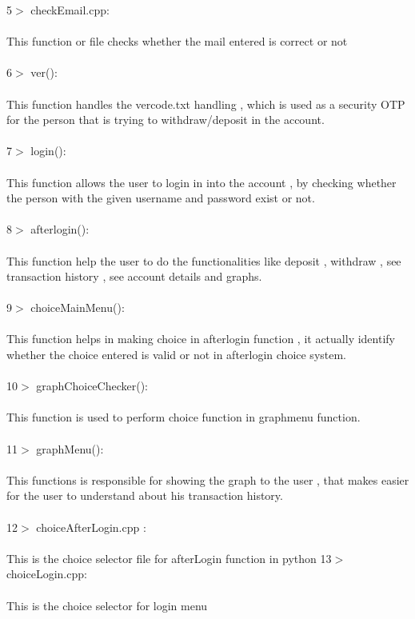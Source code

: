 \documentclass[11pt]{article}
\begin{document}
5$>$ checkEmail.cpp:\\\\
This function or file checks whether the mail entered is correct or not\\\\
6$>$ ver():\\\\
This function handles the vercode.txt handling , which is used as a security OTP for the person that is trying to withdraw/deposit in the account.\\\\
7$>$ login():\\\\
This function allows the user to login in into the account , by checking whether the person with the given username and password exist or not.\\\\
8$>$ afterlogin():\\\\
This function help the user to do the functionalities like deposit , withdraw , see transaction history , see account details and graphs.\\\\
9$>$ choiceMainMenu():\\\\
This function helps in making choice in afterlogin function , it actually identify whether the choice entered is valid or not in afterlogin choice system.\\\\
10$>$ graphChoiceChecker():\\\\
This function is used to perform choice function in graphmenu function.\\\\
11$>$ graphMenu():\\\\
This functions is responsible for showing the graph to the user , that makes easier for the user to understand about his transaction history.\\\\
12$>$ choiceAfterLogin.cpp :\\\\
This is the choice selector file for afterLogin function in python
13$>$ choiceLogin.cpp:\\\\
This is the choice selector for login menu
\end{document}

